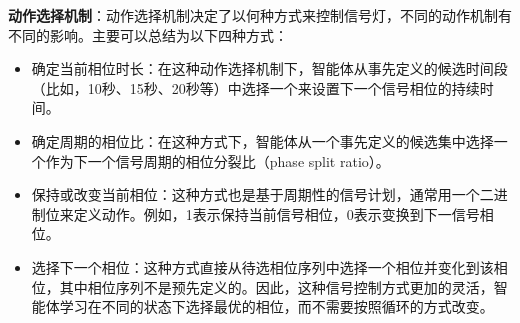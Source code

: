 \textbf{动作选择机制}：动作选择机制决定了以何种方式来控制信号灯，不同的动作机制有不同的影响。主要可以总结为以下四种方式：
\begin{itemize}
    \item 确定当前相位时长：在这种动作选择机制下，智能体从事先定义的候选时间段（比如，10秒、15秒、20秒等）中选择一个来设置下一个信号相位的持续时间。
    \item 确定周期的相位比：在这种方式下，智能体从一个事先定义的候选集中选择一个作为下一个信号周期的相位分裂比（phase split ratio）。
    \item 保持或改变当前相位：这种方式也是基于周期性的信号计划，通常用一个二进制位来定义动作。例如，1表示保持当前信号相位，0表示变换到下一信号相位。
    \item 选择下一个相位：这种方式直接从待选相位序列中选择一个相位并变化到该相位，其中相位序列不是预先定义的。因此，这种信号控制方式更加的灵活，智能体学习在不同的状态下选择最优的相位，而不需要按照循环的方式改变。
\end{itemize}


